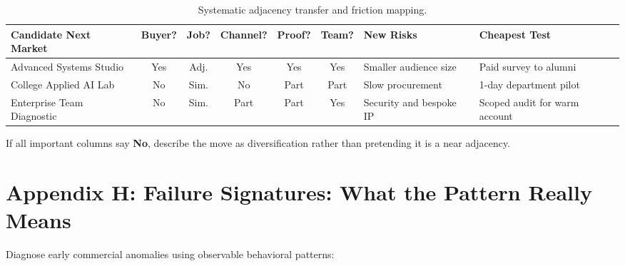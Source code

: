 \begin{table}[t]
\centering
\small
\begin{tabularx}{\textwidth}{l c c c c c p{3.2cm} X}
\toprule
\textbf{Candidate Next Market} & \textbf{Buyer?} & \textbf{Job?} & \textbf{Channel?} & \textbf{Proof?} & \textbf{Team?} & \textbf{New Risks} & \textbf{Cheapest Test} \\
\midrule
Advanced Systems Studio & Yes & Adj. & Yes & Yes & Yes & Smaller audience size & Paid survey to alumni \\
College Applied AI Lab & No & Sim. & No & Part & Part & Slow procurement & 1-day department pilot \\
Enterprise Team Diagnostic & No & Sim. & Part & Part & Yes & Security and bespoke IP & Scoped audit for warm account \\
\bottomrule
\end{tabularx}
\caption{Systematic adjacency transfer and friction mapping.}
\label{tab:ch7-adjacencies-map}
\end{table}

If all important columns say \textbf{No}, describe the move as diversification rather than pretending it is a near adjacency.

\section*{Appendix H: Failure Signatures: What the Pattern Really Means}

Diagnose early commercial anomalies using observable behavioral patterns:

